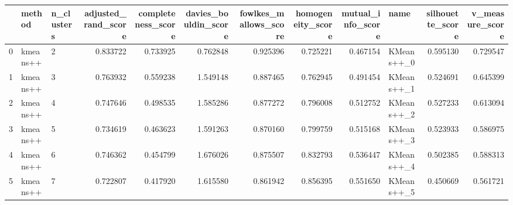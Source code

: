 \begin{tabular}{lllrrrrrrlrr}
\toprule
{} &    method & n\_clusters &  adjusted\_rand\_score &  completeness\_score &  davies\_bouldin\_score &  fowlkes\_mallows\_score &  homogeneity\_score &  mutual\_info\_score &        name &  silhouette\_score &  v\_measure\_score \\
\midrule
0 &  kmeans++ &          2 &             0.833722 &            0.733925 &              0.762848 &               0.925396 &           0.725221 &           0.467154 &  KMeans++\_0 &          0.595130 &         0.729547 \\
1 &  kmeans++ &          3 &             0.763932 &            0.559238 &              1.549148 &               0.887465 &           0.762945 &           0.491454 &  KMeans++\_1 &          0.524691 &         0.645399 \\
2 &  kmeans++ &          4 &             0.747646 &            0.498535 &              1.585286 &               0.877272 &           0.796008 &           0.512752 &  KMeans++\_2 &          0.527233 &         0.613094 \\
3 &  kmeans++ &          5 &             0.734619 &            0.463623 &              1.591263 &               0.870160 &           0.799759 &           0.515168 &  KMeans++\_3 &          0.523933 &         0.586975 \\
4 &  kmeans++ &          6 &             0.746362 &            0.454799 &              1.676026 &               0.875507 &           0.832793 &           0.536447 &  KMeans++\_4 &          0.502385 &         0.588313 \\
5 &  kmeans++ &          7 &             0.722807 &            0.417920 &              1.615580 &               0.861942 &           0.856395 &           0.551650 &  KMeans++\_5 &          0.450669 &         0.561721 \\
\bottomrule
\end{tabular}
